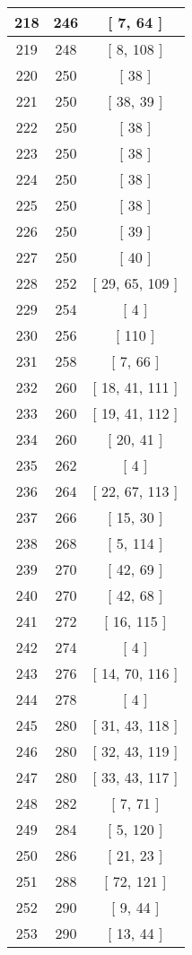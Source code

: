 \begin{center}
\begin{longtable}[H]{|| c c c ||}
\hline
218 & 246 & [ 7, 64 ] \\ 
\hline
219 & 248 & [ 8, 108 ] \\ 
\hline
220 & 250 & [ 38 ] \\ 
\hline
221 & 250 & [ 38, 39 ] \\ 
\hline
222 & 250 & [ 38 ] \\ 
\hline
223 & 250 & [ 38 ] \\ 
\hline
224 & 250 & [ 38 ] \\ 
\hline
225 & 250 & [ 38 ] \\ 
\hline
226 & 250 & [ 39 ] \\ 
\hline
227 & 250 & [ 40 ] \\ 
\hline
228 & 252 & [ 29, 65, 109 ] \\ 
\hline
229 & 254 & [ 4 ] \\ 
\hline
230 & 256 & [ 110 ] \\ 
\hline
231 & 258 & [ 7, 66 ] \\ 
\hline
232 & 260 & [ 18, 41, 111 ] \\ 
\hline
233 & 260 & [ 19, 41, 112 ] \\ 
\hline
234 & 260 & [ 20, 41 ] \\ 
\hline
235 & 262 & [ 4 ] \\ 
\hline
236 & 264 & [ 22, 67, 113 ] \\ 
\hline
237 & 266 & [ 15, 30 ] \\ 
\hline
238 & 268 & [ 5, 114 ] \\ 
\hline
239 & 270 & [ 42, 69 ] \\ 
\hline
240 & 270 & [ 42, 68 ] \\ 
\hline
241 & 272 & [ 16, 115 ] \\ 
\hline
242 & 274 & [ 4 ] \\ 
\hline
243 & 276 & [ 14, 70, 116 ] \\ 
\hline
244 & 278 & [ 4 ] \\ 
\hline
245 & 280 & [ 31, 43, 118 ] \\ 
\hline
246 & 280 & [ 32, 43, 119 ] \\ 
\hline
247 & 280 & [ 33, 43, 117 ] \\ 
\hline
248 & 282 & [ 7, 71 ] \\ 
\hline
249 & 284 & [ 5, 120 ] \\ 
\hline
250 & 286 & [ 21, 23 ] \\ 
\hline
251 & 288 & [ 72, 121 ] \\ 
\hline
252 & 290 & [ 9, 44 ] \\ 
\hline
253 & 290 & [ 13, 44 ] \\ 

\end{longtable}
\end{center}
